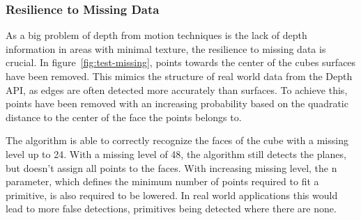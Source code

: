 \subsubsection{Resilience to Missing Data}

As a big problem of depth from motion techniques is the lack of depth information in areas with minimal texture,
the resilience to missing data is crucial.
In figure~\ref{fig:test-missing}, points towards the center of the cubes surfaces have been removed.
This mimics the structure of real world data from the Depth API,
as edges are often detected more accurately than surfaces.
To achieve this, points have been removed with an increasing probability based on the
quadratic distance to the center of the face the points belongs to.

The algorithm is able to correctly recognize the faces of the cube with a missing level up to 24.
With a missing level of 48, the algorithm still detects the planes, but doesn't assign all points to the faces.
With increasing missing level, the n parameter, which defines the minimum number of points required to fit a primitive,
is also required to be lowered.
In real world applications this would lead to more false detections, primitives being detected where there are none.

%
%


